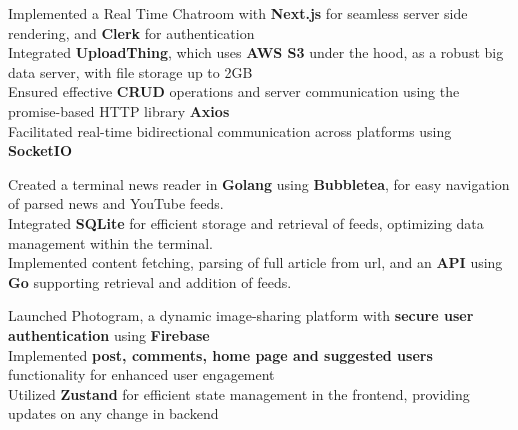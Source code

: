 \documentclass[]{Nikhil_Kadiyan_Resume}
\begin{document}
\pt Implemented a Real Time Chatroom  with \textbf{Next.js} for seamless server side rendering, and \textbf{Clerk} for authentication\\
\pt Integrated \textbf{UploadThing}, which uses \textbf{AWS S3} under the hood, as a robust big data server, with file storage up to 2GB\\
\pt Ensured effective \textbf{CRUD} operations and server communication using the promise-based HTTP library \textbf{Axios}\\
\pt Facilitated real-time bidirectional communication across platforms using \textbf{SocketIO}\\
\sectionsep

\pt Created a terminal news reader in \textbf{Golang} using \textbf{Bubbletea}, for easy navigation of parsed news and YouTube feeds.\\
\pt Integrated \textbf{SQLite} for efficient storage and retrieval of feeds, optimizing data management within the terminal. \\
\pt Implemented content fetching, parsing of full article from url, and an \textbf{API} using \textbf{Go} supporting retrieval and addition of feeds.\\
\sectionsep

\pt Launched Photogram, a dynamic image-sharing platform with \textbf{secure user authentication} using \textbf{Firebase}\\
\pt Implemented \textbf{post, comments, home page and suggested users} functionality for enhanced user engagement \\
\pt Utilized \textbf{Zustand} for efficient state management in the frontend, providing updates on any change in backend\\
\sectionsep
\end{document}

